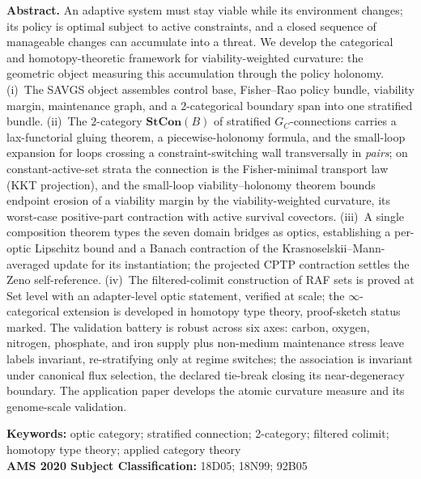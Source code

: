 \documentclass[11pt,a4paper]{article}
\theoremstyle{plain}
\theoremstyle{definition}
\theoremstyle{remark}
\begin{document}
\vspace{0.6em}
\begin{center}
\begin{minipage}{0.92\textwidth}
\small
\textbf{Abstract.} An adaptive system must stay viable while its
environment changes; its policy is optimal subject to active
constraints, and a closed sequence of manageable changes can
accumulate into a threat. We develop the categorical and
homotopy-theoretic framework for viability-weighted curvature: the
geometric object measuring this accumulation through the policy
holonomy.
(i)~The SAVGS object assembles control base, Fisher--Rao
policy bundle, viability margin, maintenance graph, and a
$2$-categorical boundary span into one stratified bundle.
(ii)~The $2$-category $\mathbf{StCon}(B)$ of stratified
$G_C$-connections carries a lax-functorial gluing theorem, a
piecewise-holonomy formula, and the small-loop expansion for loops
crossing a constraint-switching wall transversally in
\emph{pairs}; on constant-active-set strata the connection is the
Fisher-minimal transport law (KKT projection), and the small-loop
viability--holonomy theorem bounds endpoint erosion of a viability
margin by the viability-weighted curvature, its worst-case
positive-part contraction with active survival covectors.
(iii)~A single composition theorem types the seven domain bridges
as optics, establishing a per-optic Lipschitz bound and a Banach
contraction of the Krasnoselskii--Mann-averaged update for its
instantiation; the projected CPTP contraction
settles the Zeno self-reference.
(iv)~The filtered-colimit construction of RAF sets is proved at Set
level with an adapter-level optic statement, verified at scale;
the $\infty$-categorical extension is developed in homotopy type
theory, proof-sketch status marked. The validation battery is
robust across six axes: carbon, oxygen, nitrogen,
phosphate, and iron supply plus non-medium maintenance stress
leave labels invariant, re-stratifying only at
regime switches; the association is invariant under canonical
flux selection, the declared tie-break closing its near-degeneracy
boundary. The application paper
develops the atomic curvature measure and its genome-scale
validation.
\par
\vspace{0.5em}

\noindent\textbf{Keywords:} optic category; stratified connection;
2-category; filtered colimit; homotopy type theory;
applied category theory\\[0.3em]
\noindent\textbf{AMS 2020 Subject Classification:} 18D05; 18N99;
92B05\par
\end{minipage}
\end{center}
\end{document}

